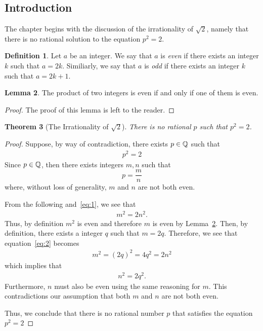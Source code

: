 \documentclass[../ch1.tex, ../../main.tex]{subfiles}
\begin{document}
\subsection{Introduction}

The chapter begins with the discussion of the irrationality of
$\sqrt{2}$, namely that there is no rational solution to the
equation $p^2 = 2$.

\newtheorem{thm}{Theorem}[subsection]
\theoremstyle{definition}
\newtheorem{defn}[thm]{Definition}
\newtheorem{lem}[thm]{Lemma}

\begin{defn}
    Let $a$ be an integer. We say that $a$ is \textit{even}
    if there exists an integer $k$ such that $a = 2k$.
    Similiarly, we say that $a$ is \textit{odd}
    if there exists an integer $k$ such that $a = 2k + 1$.
\end{defn}

\begin{lem}
    \label{lem:1}
    The product of two integers is even if and only if one of
    them is even.
\end{lem}
\begin{proof}

    The proof of this lemma is left to the reader. \qedhere
\end{proof}

\begin{thm}[The Irrationality of $\sqrt{2}$]
    There is no rational $p$ such that $p^2 = 2$.
\end{thm}
\begin{proof}
    Suppose, by way of contradiction, there exists $p \in \mathbb{Q}$ such that
    \begin{align}
        p^2 = 2 \label{eq:1}
    \end{align}
    Since $p \in \mathbb{Q}$, then there exists integers $m, n$ such that
    $$p = \frac{m}{n}$$ where, without loss of generality,
    $m$ and $n$ are not both even.

    From the following and~\eqref{eq:1}, we see that
    \begin{align}
        m^2 = 2n^2. \label{eq:2}
    \end{align}
    Thus, by definition $m^2$ is even and therefore
    $m$ is even by Lemma~\ref{lem:1}.
    Then, by definition, there exists a integer $q$ 
    such that $m = 2q$. Therefore, we see that
    equation~\eqref{eq:2} becomes
    \begin{align}
        m^2 = (2q)^2 = 4q^2 = 2n^2 \label{eq:3}
    \end{align} which implies that
    \begin{align}
        n^2 = 2q^2. \label{eq:4}
    \end{align}
    Furthermore, $n$ must also be even using the same
    reasoning for $m$. This contradictions our assumption that both
    $m$ and $n$ are not both even.

    Thus, we conclude that there is no rational number $p$
    that satisfies the equation $p^2 = 2$\qedhere
\end{proof}
\end{document}
